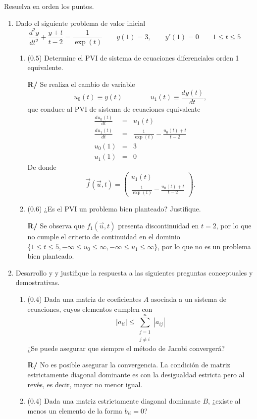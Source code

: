 \documentclass[12pt]{article}
\newcommand{\diff}[3]{\frac{d^{#3} #1}{d#2^{#3}}}
\begin{document}
Resuelva en orden los puntos.
\vspace{-.5cm}
  \begin{enumerate}[leftmargin=*,widest=9]
    \item Dado el siguiente problema de valor inicial
    \[
    \diff{y}{t}{2} + \frac{y+t}{t-2} = \frac{1}{\exp(t)} \qquad y(1) = 3, \qquad y\prime(1) = 0 \qquad 1 \leq t \leq 5
    \]
    \begin{enumerate}[label=\alph*]
    \item (\(0.5\)) Determine el PVI de sistema de ecuaciones diferenciales orden 1 equivalente.

\textbf{R/}    Se realiza el cambio de variable
   \[u_0(t) \equiv y(t) \qquad \qquad u_1(t) \equiv \diff{y(t)}{t}{}, \]
   que conduce al PVI de sistema de ecuaciones equivalente
   \begin{eqnarray*}
   \diff{u_0(t)}{t}{} &=& u_1(t)\\
   \diff{u_1(t)}{t}{} &=& \frac{1}{\exp(t)}-\frac{u_0(t)+t}{t-2}\\
   u_0(1) &=& 3 \\
   u_1(1) &=& 0
   \end{eqnarray*}
   De donde
   \[ \vec{f}(\vec{u}, t) = \begin{pmatrix}
   u_1(t) \\ \frac{1}{\exp(t)}-\frac{u_0(t)+t}{t-2}
\end{pmatrix}  .  \]
    \item (\(0.6\)) ¿Es el PVI un problema bien planteado? Justifique.

\textbf{R/} Se observa que \(f_1(\vec{u},t)\) presenta discontinuidad en \(t= 2\), por lo que no cumple el criterio de continuidad en el dominio \(\lbrace 1 \leq t \leq 5, -\infty \leq u_0 \leq \infty, -\infty \leq u_1 \leq \infty \rbrace \), por lo que no es un problema bien planteado.
    \end{enumerate}
    \item Desarrollo y y justifique la respuesta a las siguientes preguntas conceptuales y demostrativas.
    \begin{enumerate}[label=\alph*]
    \item (\(0.4\)) Dada una matriz de coeficientes \(A\) asociada a un sistema de ecuaciones, cuyos elementos cumplen con
\[
|a_{ii}| \leq \sum\limits_{\substack{j=1\\j\neq i}}^{n} |a_{ij}|
\]
¿Se puede asegurar que siempre el método de Jacobi convergerá?

\textbf{R/} No es posible asegurar la convergencia. La condición de matriz estrictamente diagonal dominante es con la desigualdad estricta pero al revés, es decir, mayor no menor igual.
    \item (\(0.4\)) Dada una matriz estrictamente diagonal dominante \(B\), ¿existe al menos un elemento de la forma \(b_{ii} = 0\)?


\end{enumerate}
\end{enumerate}
\end{document}
